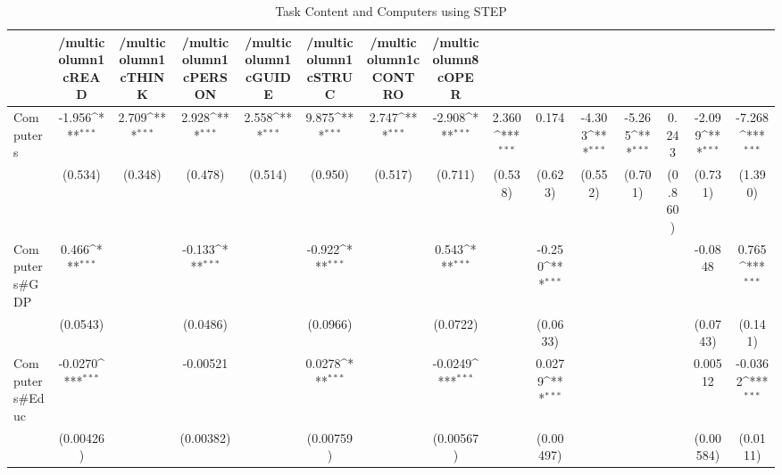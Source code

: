 \begin{table}[htbp]\centering
\def\sym#1{\ifmmode^{#1}\else\(^{#1}\)\fi}
\caption{Task Content and Computers using STEP}
\begin{tabular}{l*{14}{c}}
\hline\hline
            &/multicolumn{1}{c}{READ}&/multicolumn{1}{c}{THINK}&/multicolumn{1}{c}{PERSON}&/multicolumn{1}{c}{GUIDE}&/multicolumn{1}{c}{STRUC}&/multicolumn{1}{c}{CONTRO}&/multicolumn{8}{c}{OPER}                                                                                                                                                       \\
\hline
Computers   &      -1.956\sym{***}&       2.709\sym{***}&       2.928\sym{***}&       2.558\sym{***}&       9.875\sym{***}&       2.747\sym{***}&      -2.908\sym{***}&       2.360\sym{***}&       0.174         &      -4.303\sym{***}&      -5.265\sym{***}&       0.243         &      -2.099\sym{***}&      -7.268\sym{***}\\
            &     (0.534)         &     (0.348)         &     (0.478)         &     (0.514)         &     (0.950)         &     (0.517)         &     (0.711)         &     (0.538)         &     (0.623)         &     (0.552)         &     (0.701)         &     (0.860)         &     (0.731)         &     (1.390)         \\
[1em]
Computers#GDP&       0.466\sym{***}&                     &      -0.133\sym{***}&                     &      -0.922\sym{***}&                     &       0.543\sym{***}&                     &      -0.250\sym{***}&                     &                     &                     &     -0.0848         &       0.765\sym{***}\\
            &    (0.0543)         &                     &    (0.0486)         &                     &    (0.0966)         &                     &    (0.0722)         &                     &    (0.0633)         &                     &                     &                     &    (0.0743)         &     (0.141)         \\
[1em]
Computers#Educ&     -0.0270\sym{***}&                     &    -0.00521         &                     &      0.0278\sym{***}&                     &     -0.0249\sym{***}&                     &      0.0279\sym{***}&                     &                     &                     &     0.00512         &     -0.0362\sym{***}\\
            &   (0.00426)         &                     &   (0.00382)         &                     &   (0.00759)         &                     &   (0.00567)         &                     &   (0.00497)         &                     &                     &                     &   (0.00584)         &    (0.0111)         \\

\end{tabular}
\end{table}
